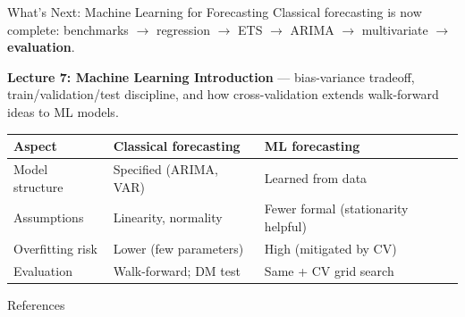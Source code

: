 \documentclass[aspectratio=169, 11pt]{beamer}
\begin{document}
\begin{frame}{What's Next: Machine Learning for Forecasting}
  Classical forecasting is now complete:
  benchmarks $\to$ regression $\to$ ETS $\to$ ARIMA $\to$ multivariate
  $\to$ \textbf{evaluation}.
  \vspace{0.05cm}
  \begin{keybox}
    \textbf{Lecture 7: Machine Learning Introduction} --- bias-variance
    tradeoff, train/validation/test discipline, and how cross-validation
    extends walk-forward ideas to ML models.
  \end{keybox}
  \vspace{0.05cm}
  \begin{center}
    {\small
    \begin{tabular}{lll}
      \toprule
      \textbf{Aspect} & \textbf{Classical forecasting} & \textbf{ML forecasting} \\
      \midrule
      Model structure  & Specified (ARIMA, VAR)    & Learned from data \\
      Assumptions      & Linearity, normality      & Fewer formal (stationarity helpful) \\
      Overfitting risk & Lower (few parameters)    & High (mitigated by CV) \\
      Evaluation       & Walk-forward; DM test     & Same + CV grid search \\
      \bottomrule
    \end{tabular}
    }
  \end{center}
\end{frame}

\begin{frame}[allowframebreaks]{References}
  \printbibliography[heading=none]
\end{frame}
\end{document}
